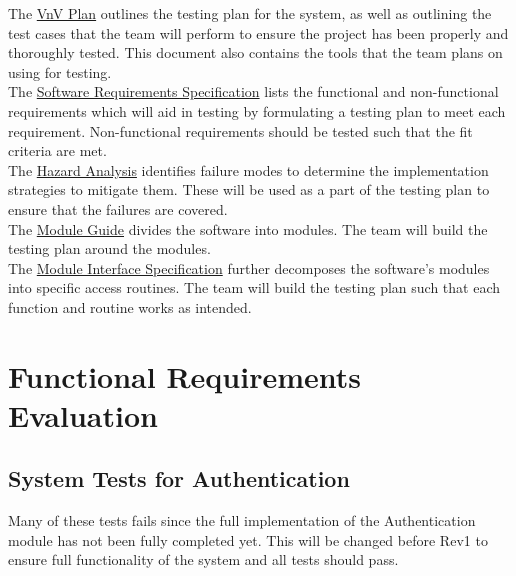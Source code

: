 \documentclass[12pt, titlepage]{article}
\begin{document}
\noindent The \href{https://github.com/stanreee/sign-language-learning/blob/main/docs/VnVPlan/VnVPlan.pdf}{VnV Plan} outlines the testing plan for the system, as well as outlining the test cases that the team will perform to ensure the project has been properly and thoroughly tested. This document also contains the tools that the team plans on using for testing.\\

\noindent The \href{https://github.com/stanreee/sign-language-learning/blob/main/docs/SRS/SRS.pdf}{Software Requirements Specification} lists the functional and non-functional requirements which will aid in testing by formulating a testing plan to meet each requirement. Non-functional requirements should be tested such that the fit criteria are met.\\

\noindent The \href{https://github.com/stanreee/sign-language-learning/blob/main/docs/HazardAnalysis/HazardAnalysis.pdf}{Hazard Analysis} identifies failure modes to determine the implementation strategies to mitigate them. These will be used as a part of the testing plan to ensure that the failures are covered.\\

\noindent The \href{https://github.com/stanreee/sign-language-learning/blob/main/docs/Design/SoftArchitecture/MG.pdf}{Module Guide} divides the software into modules. The team will build the testing plan around the modules.\\

\noindent The \href{https://github.com/stanreee/sign-language-learning/blob/main/docs/Design/SoftDetailedDes/MIS.pdf}{Module Interface Specification} further decomposes the software's modules into specific access routines. The team will build the testing plan such that each function and routine works as intended.

\section{Functional Requirements Evaluation}

\subsection{System Tests for Authentication}
Many of these tests fails since the full implementation of the Authentication module has not been fully completed yet. This will be changed before Rev1 to ensure full functionality of the system and all tests should pass. 
\end{document}
